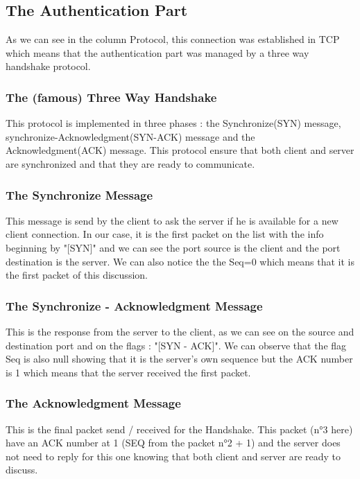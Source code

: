 \documentclass[a4paper]{article}
\begin{document}
\subsection{The Authentication Part}

As we can see in the column Protocol, this connection was established in TCP which means that the authentication part was managed by a three way handshake protocol.

\subsubsection{The (famous) Three Way Handshake}

This protocol is implemented in three phases : the Synchronize(SYN) message, synchronize-Acknowledgment(SYN-ACK) message and the Acknowledgment(ACK) message. This protocol ensure that both client and server are synchronized and that they are ready to communicate.

\subsubsection{The Synchronize Message}

This message is send by the client to ask the server if he is available for a new client connection.
In our case, it is the first packet on the list with the info beginning by "[SYN]" and we can see the port source is the client and the port destination is the server.
We can also notice the the Seq=0 which means that it is the first packet of this discussion.

\subsubsection{The Synchronize - Acknowledgment Message}

This is the response from the server to the client, as we can see on the source and destination port and on the flags : "[SYN - ACK]".
We can observe that the flag Seq is also null showing that it is the server's own sequence but the ACK number is 1 which means that the server received the first packet.

\subsubsection{The Acknowledgment Message}

This is the final packet send / received for the Handshake. This packet (n°3 here) have an ACK number at 1 (SEQ from the packet n°2 + 1) and the server does not need to reply for this one knowing that both client and server are ready to discuss.
\end{document}
